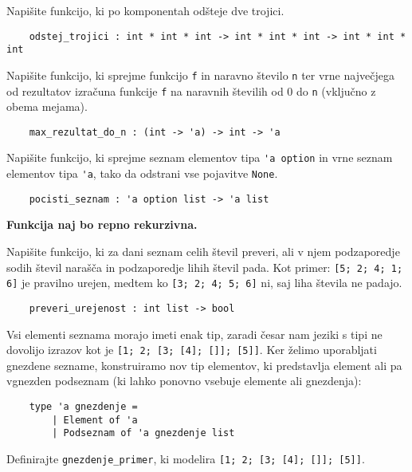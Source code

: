\documentclass[arhiv]{../izpit}
\begin{document}

\naloga[]

\podnaloga
Napišite funkcijo, ki po komponentah odšteje dve trojici.
\begin{verbatim}
    odstej_trojici : int * int * int -> int * int * int -> int * int * int
\end{verbatim}

\podnaloga
Napišite funkcijo, ki sprejme funkcijo \verb|f| in naravno število \verb|n| ter vrne največjega od rezultatov izračuna funkcije \verb|f| na naravnih številih od 0 do \verb|n| (vključno z obema mejama).
\begin{verbatim}
    max_rezultat_do_n : (int -> 'a) -> int -> 'a
\end{verbatim}

\podnaloga
Napišite funkcijo, ki sprejme seznam elementov tipa \verb|'a option| in vrne seznam elementov tipa \verb|'a|, tako da odstrani vse pojavitve \verb|None|. 
\begin{verbatim}
    pocisti_seznam : 'a option list -> 'a list
\end{verbatim}
\textbf{Funkcija naj bo repno rekurzivna.}

\podnaloga
Napišite funkcijo, ki za dani seznam celih števil preveri, ali v njem podzaporedje sodih števil narašča in podzaporedje lihih števil pada.
Kot primer: \verb|[5; 2; 4; 1; 6]| je pravilno urejen, medtem ko \verb|[3; 2; 4; 5; 6]| ni, saj liha števila ne padajo.
\begin{verbatim}
    preveri_urejenost : int list -> bool
\end{verbatim}


\naloga

Vsi elementi seznama morajo imeti enak tip, zaradi česar nam jeziki s tipi ne dovolijo izrazov kot je \verb|[1; 2; [3; [4]; []]; [5]]|. Ker želimo uporabljati gnezdene sezname, konstruiramo nov tip elementov, ki predstavlja element ali pa vgnezden podseznam (ki lahko ponovno vsebuje elemente ali gnezdenja):

\begin{verbatim}
    type 'a gnezdenje =
        | Element of 'a
        | Podseznam of 'a gnezdenje list
\end{verbatim}

\podnaloga
Definirajte \verb|gnezdenje_primer|, ki modelira \verb|[1; 2; [3; [4]; []]; [5]]|.
\end{document}
